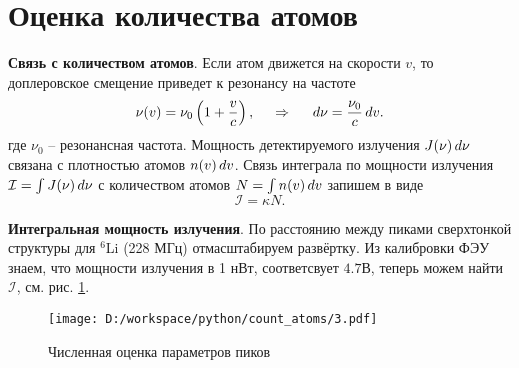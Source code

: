 \section*{Оценка количества атомов}


\textbf{Связь с количеством атомов}. 
Если атом движется на скорости $v$, то доплеровское смещение приведет к резонансу на частоте
\begin{equation*}
	\nu(v) = \nu_0 \left(1 + \frac{v}{c}\right),
	\hspace{0.5cm} \Rightarrow \hspace{0.5cm}
	d \nu = \frac{\nu_0}{c} \, d v.
\end{equation*}
где $\nu_0$ -- резонансная частота.
Мощность детектируемого излучения $J(\nu) \, d \nu$ связана с плотностью атомов $n(v) \, d v$. 
Связь интеграла по мощности излучения $\mathcal I = \int J(\nu) \, d \nu$ с количеством атомов $N = \int n(v) \, d v$ запишем в виде
\begin{equation*}
	\mathcal I = \kappa N.
\end{equation*}

\textbf{Интегральная мощность излучения}. По расстоянию между пиками сверхтонкой структуры для ${}^6$Li (228 МГц) отмасштабируем развёртку. Из калибровки ФЭУ знаем, что мощности излучения в 1 нВт, соответсвует $4.7$В, теперь можем найти $\mathcal I$, см. рис. \ref{fig:1}.

\begin{figure}[h]
    \centering
    \vspace{-4mm}
    \texttt{[image: D:/workspace/python/count\_atoms/3.pdf]}
    \vspace{-4mm}
    \caption{Численная оценка параметров пиков}
    \label{fig:1}
\end{figure}
\vspace{-4mm}


